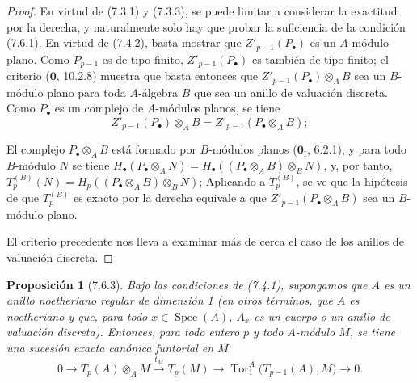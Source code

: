 \documentclass[10pt,oneside,openany]{book}
\theoremstyle{egaenv}\newtheorem*{env}{---}
\theoremstyle{egastatement}
\newtheorem*{proposition}{Proposición}
\theoremstyle{egadescription}
\newcommand{\oldpage}[2][]{\marginnote{\normalfont\scriptsize\textbf{#1}\,|\,#2}\ignorespaces}
\begin{document}
\begin{proof}
En virtud de (7.3.1) y (7.3.3), se puede limitar a considerar la exactitud por la
derecha, y naturalmente solo hay que probar la suficiencia de la condición
(7.6.1). En virtud de (7.4.2), basta mostrar que
$Z'_{p-1}(P_\bullet)$ es un
$A$-módulo plano. Como $P_{p-1}$ es de tipo finito,
$Z'_{p-1}(P_\bullet)$ es también de tipo finito; el criterio ($\mathbf{0}$, 10.2.8) muestra
que basta entonces que $Z'_{p-1}(P_\bullet)\otimes_A B$
sea un $B$-módulo plano para toda $A$-álgebra $B$ que sea un anillo
de valuación discreta. Como $P_\bullet$ es un complejo de
$A$-módulos planos, se tiene
\[
  Z'_{p-1}(P_\bullet)\otimes_A B
  =
  Z'_{p-1}(P_\bullet\otimes_A B);
\]

\oldpage[III]{193}
El complejo $P_\bullet\otimes_A B$ está formado por $B$-módulos planos
($\mathbf{0}_{\mathrm I}$, 6.2.1), y para todo $B$-módulo $N$ se tiene
$H_\bullet(P_\bullet\otimes_A N)=H_\bullet((P_\bullet\otimes_A B)\otimes_B N)$,
y, por tanto,
$T_p^{(B)}(N)=H_p((P_\bullet\otimes_A B)\otimes_B N)$;
Aplicando  a $T_p^{(B)}$, se ve que la hipótesis de
que $T_p^{(B)}$ es exacto por la derecha equivale a que
$Z'_{p-1}(P_\bullet\otimes_A B)$ sea un $B$-módulo plano.

El criterio precedente nos lleva a examinar más de cerca el caso de
los anillos de valuación discreta.
\end{proof}

\begin{proposition}[7.6.3]
Bajo las condiciones de \textup{(7.4.1)}, supongamos que $A$ es un anillo noetheriano
regular de dimensión 1 (en otros términos, que $A$ es noetheriano y que, para todo
$x\in\operatorname{Spec}(A)$, $A_x$ es un cuerpo o un anillo de valuación
discreta). Entonces, para todo entero $p$ y todo $A$-módulo $M$, se tiene una sucesión
exacta canónica funtorial en $M$
\[
  0
  \longrightarrow T_p(A)\otimes_A M
  \xrightarrow{t_M}T_p(M)
  \longrightarrow \operatorname{Tor}_1^A\bigl(T_{p-1}(A),M\bigr)
  \longrightarrow0.
  \tag{7.6.3.1}\label{III.7.6.3.1.fr}
\]
\end{proposition}
\end{document}

